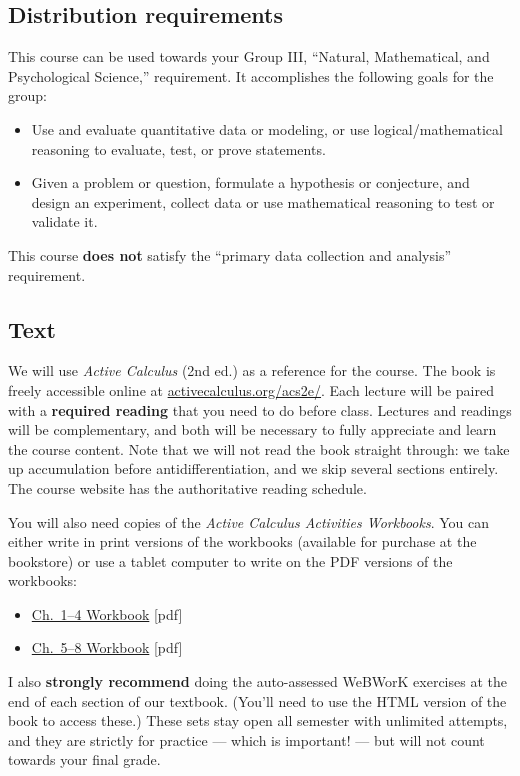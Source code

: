 \documentclass[11pt,twoside]{amsart}
\begin{document}
\subsection*{Distribution requirements}
This course can be used towards your Group III, ``Natural, Mathematical, and Psychological Science,'' requirement.  It accomplishes the following goals for the group:
\begin{itemize}
\item Use and evaluate quantitative data or modeling, or use logical/mathematical reasoning to evaluate, test, or prove statements.
\item Given a problem or question, formulate a hypothesis or conjecture, and design an experiment, collect data or use mathematical reasoning to test or validate it.
\end{itemize}
This course \textbf{does not} satisfy the ``primary data collection and analysis'' requirement.

\subsection*{Text}
We will use \emph{Active Calculus} (2nd ed.) as a reference for the course.  The book is freely accessible  online at \href{https://activecalculus.org/acs2e/}{activecalculus.org/acs2e/}.  Each lecture will be paired with a \textbf{required reading} that you need to do before class.  Lectures and readings will be complementary, and both will be necessary to fully appreciate and learn the course content. Note that we will not read the book straight through: we take up accumulation before antidifferentiation, and we skip several sections entirely. The course website has the authoritative reading schedule.

You will also need copies of the \emph{Active Calculus Activities Workbooks}. You can either write in print versions of the workbooks (available for purchase at the bookstore) or use a tablet computer to write on the PDF versions of the workbooks:
\begin{itemize}
\item \href{https://activecalculus.org/wp-content/uploads/2024/08/acs-activity-workbook-14-2024.pdf}{Ch.~1--4 Workbook} [pdf]
\item \href{https://activecalculus.org/wp-content/uploads/2024/08/acs-activity-workbook-58-2024.pdf}{Ch.~5--8 Workbook} [pdf]
\end{itemize}

I also \textbf{strongly recommend} doing the auto-assessed WeBWorK exercises at the end of each section of our textbook. (You'll need to use the HTML version of the book to access these.) These sets stay open all semester with unlimited attempts, and they are strictly for practice --- which is important! --- but will not count towards your final grade.
\end{document}
